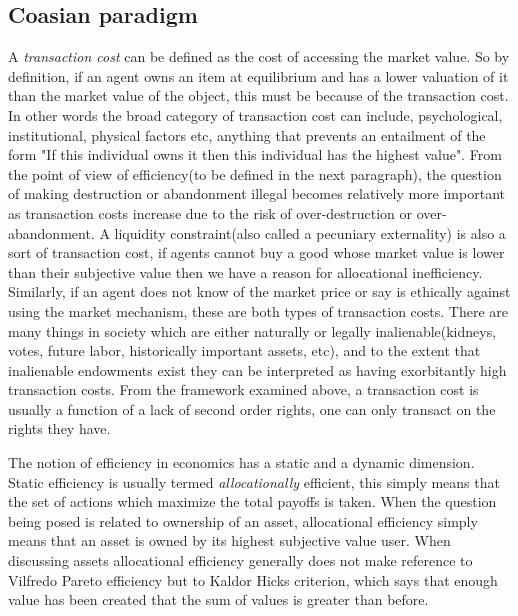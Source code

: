 \documentclass[12pt]{article}
\numberwithin{equation}{section}
\begin{document}
\subsection{Coasian paradigm}

A \textit{transaction cost} can be defined as the cost of accessing the market value. So by definition, if an agent owns an item at equilibrium and has a lower valuation of it than the market value of the object, this must be because of the transaction cost. In other words the broad category of transaction cost can include, psychological, institutional, physical factors etc, anything that prevents an entailment of the form "If this individual owns it then this individual has the highest value". From the point of view of efficiency(to be defined in the next paragraph), the question of making destruction or abandonment illegal becomes relatively more important as transaction costs increase due to the risk of over-destruction or over-abandonment. A liquidity constraint(also called a pecuniary externality) is also a sort of transaction cost, if agents cannot buy a good whose market value is lower than their subjective value then we have a reason for allocational inefficiency. Similarly, if an agent does not know of the market price or say is ethically against using the market mechanism, these are both types of transaction costs. There are many things in society which are either naturally or legally inalienable(kidneys, votes, future labor, historically important assets, etc), and to the extent that inalienable endowments exist they can be interpreted as having exorbitantly high transaction costs. From the framework examined above, a transaction cost is usually a function of a lack of second order rights, one can only transact on the rights they have.


The notion of efficiency in economics has a static and a dynamic dimension. Static efficiency is usually termed \textit{allocationally} efficient, this simply means that the set of actions which maximize the total payoffs is taken. When the question being posed is related to ownership of an asset, allocational efficiency simply means that an asset is owned by its highest subjective value user. When discussing assets allocational efficiency generally does not make reference to Vilfredo Pareto efficiency but to Kaldor Hicks criterion, which says that enough value has been created that the sum of values is greater than before.

\end{document}
